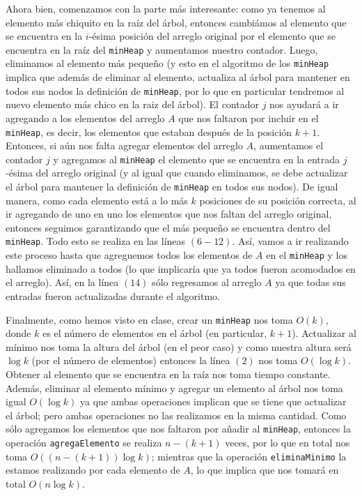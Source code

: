 \documentclass[letterpaper,11pt]{article}
\begin{document}
\begin{enumerate}
    Ahora bien, comenzamos con la parte más interesante: como ya tenemos al 
    elemento más chiquito en la raíz del árbol, entonces cambiámos al elemento 
    que se encuentra en la $i$-ésima posición del arreglo original por el 
    elemento que se encuentra en la raíz del \texttt{minHeap} y aumentamos 
    nuestro contador. Luego, eliminamos al elemento más pequeño (y esto en el 
    algoritmo de los \texttt{minHeap} implica que además de eliminar al elemento, 
    actualiza al árbol para mantener en todos sus nodos la definición de 
    \texttt{minHeap}, por lo que en particular tendremos al nuevo elemento más 
    chico en la raiz del árbol). El contador $j$ nos ayudará a ir 
    agregando a los elementos del arreglo $A$ que nos faltaron por incluir en 
    el \texttt{minHeap}, es decir, los elementos que estaban después de la 
    posición $k+1$. Entonces, si aún nos falta agregar elementos del arreglo $A$, 
    aumentamos el contador $j$ y agregamos al \texttt{minHeap} el elemento que 
    se encuentra en la entrada $j$-ésima del arreglo original (y al igual que 
    cuando eliminamos, se debe actualizar el árbol para mantener la definición 
    de \texttt{minHeap} en todos sus nodos). De igual manera, como cada elemento 
    está a lo más $k$ posiciones de su posición correcta, al ir agregando de 
    uno en uno los elementos que nos faltan del arreglo original, entonces 
    seguimos garantizando que el más pequeño se encuentra dentro del 
    \texttt{minHeap}. Todo esto se realiza en las líneas $(6 - 12)$. Así,
    vamos a ir realizando este proceso hasta que agreguemos todos los elementos
    de $A$ en el \texttt{minHeap} y los hallamos eliminado a todos (lo que 
    implicaría que ya todos fueron acomodados en el arreglo). Así, en la 
    línea $(14)$ sólo regresamos al arreglo $A$ ya que todas sus entradas fueron
    actualizadas durante el algoritmo.

    Finalmente, como hemos visto en clase, crear un \texttt{minHeap} nos toma 
    $O(k)$, donde $k$ es el número de elementos en el árbol (en particular, 
    $k+1$). Actualizar al mínimo nos toma la altura del árbol (en el peor caso) 
    y como nuestra altura será $\log k$ (por el número de elementos) entonces 
    la línea $(2)$ nos toma $O(\log k)$. Obtener al elemento que se encuentra en 
    la raíz nos toma tiempo constante. Además, eliminar al elemento mínimo y 
    agregar un elemento al árbol nos toma igual $O(\log k)$ ya que ambas 
    operaciones implican que se tiene que actualizar el árbol; pero ambas 
    operaciones no las realizamos en la misma cantidad. Como sólo agregamos los 
    elementos que nos faltaron por añadir al \texttt{minHeap}, entonces la 
    operación \texttt{agregaElemento} se realiza $n-(k+1)$ veces, por lo que en 
    total nos toma $O((n-(k+1)) \log k)$; mientras que la operación 
    \texttt{eliminaMinimo} la estamos realizando por cada elemento de $A$, lo 
    que implica que nos tomará en total $O(n \log k)$. 


\end{enumerate}
\end{document}

